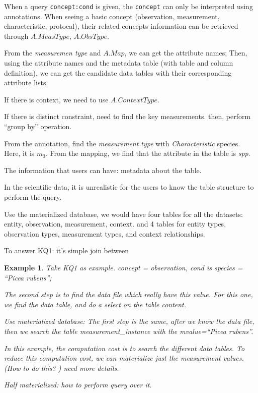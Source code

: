 \documentclass[conference]{IEEEtran}
\newtheorem{example}{Example}[section]
\begin{document}
When a query {\tt concept:cond} is given, the {\tt concept} can only be interpreted using
annotations. When seeing a basic concept (observation, measurement,
characteristic, protocal), their related concepts information can be
retrieved through $A.MeasType$, $A.ObsType$. 

From the {\em measuremen type} and $A.Map$, we can get the attribute
names; Then, using the attribute names and the metadata table (with
table and column definition), we can get the candidate data tables
with their corresponding attribute lists. 

If there is context, we need to use $A.ContextType$. 

If there is distinct constraint, need to find the key measurements. 
then, perform ``group by'' operation. 

From the annotation, find the {\em measurement type} with {\em
  Characteristic} species. 
Here, it is $m_3$. From the mapping, we find that the attribute in the
table is {\em spp}. 

The information that users can have: metadata about the table. 

In the scientific data, it is unrealistic for the users to know the
table structure to perform the query. 

Use the materialized database, we would have four tables for all the datasets: 
entity, observation, measurement, context. 
and 4 tables for entity types, observation types, measurement types,
and context relationships.

To answer KQ1: it's simple join between 

\begin{example}
Take KQ1 as example. 
concept = observation, cond is {\em species = ``Picea rubens''}; 



The second step is to find the data file which really have this
value. 
For this one, we find the data table, and do a select on the table
content. 

Use materialized database: 
The first step is the same, after we know the data file, then we
search the table {\em measurement\_instance} with the {\em mvalue=``Picea rubens''}. 

In this example, the computation cost is to search the different data
tables. To reduce this computation cost, we can materialize just the
measurement values. (How to do this? ) need more details. 

Half materialized: how to perform query over it. 
\end{example}
\end{document}
